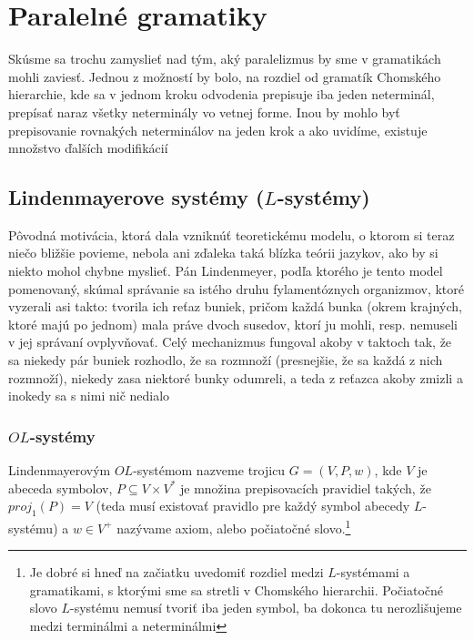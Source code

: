 \chapter{Paralelné gramatiky}

Skúsme sa trochu zamyslieť nad tým, aký paralelizmus by sme v
gramatikách mohli zaviesť. Jednou z možností by bolo, na rozdiel
od gramatík Chomského hierarchie, kde sa v jednom kroku odvodenia
prepisuje iba jeden neterminál, prepísať naraz všetky neterminály
vo vetnej forme. Inou by mohlo byť prepisovanie rovnakých
neterminálov na jeden krok a ako uvidíme, existuje množstvo
ďalších modifikácií

\section{Lindenmayerove systémy ($L$-systémy)}

\begin{motiv}
  Pôvodná motivácia, ktorá dala vzniknúť teoretickému modelu, o
  ktorom si teraz niečo bližšie povieme, nebola ani zďaleka taká
  blízka teórii jazykov, ako by si niekto mohol chybne myslieť. Pán
  Lindenmeyer, podľa ktorého je tento model pomenovaný, skúmal
  správanie sa istého druhu fylamentóznych organizmov, ktoré
  vyzerali asi takto: tvorila ich reťaz buniek, pričom každá bunka
  (okrem krajných, ktoré majú po jednom) mala práve dvoch susedov,
  ktorí ju mohli, resp. nemuseli v jej správaní ovplyvňovať. Celý
  mechanizmus fungoval akoby v taktoch tak, že sa niekedy pár buniek
  rozhodlo, že sa rozmnoží (presnejšie, že sa každá z nich
  rozmnoží), niekedy zasa niektoré bunky odumreli, a teda z reťazca
  akoby zmizli a inokedy sa s nimi nič nedialo
\end{motiv}

\subsection{$OL$-systémy}

\begin{definicia}[$OL$-systém]
  Lindenmayerovým $OL$-systémom nazveme
  trojicu $G=(V,P,w)$, kde $V$ je abeceda symbolov,
  $P\subseteq V\times V^{*}$ je množina prepisovacích
  pravidiel takých, že $proj_{1}(P)=V$ 
  (teda musí existovať pravidlo pre každý symbol abecedy $L$-systému)
  a $w\in V^{+}$ nazývame axiom, alebo
  počiatočné slovo.\footnote{
    Je dobré si hneď na začiatku uvedomiť
    rozdiel medzi $L$-systémami a gramatikami, s ktorými sme sa
    stretli v Chomského hierarchii. Počiatočné slovo
    $L$-systému nemusí tvoriť iba jeden symbol, ba dokonca tu
    nerozlišujeme medzi terminálmi a neterminálmi
  }
\end{definicia}

